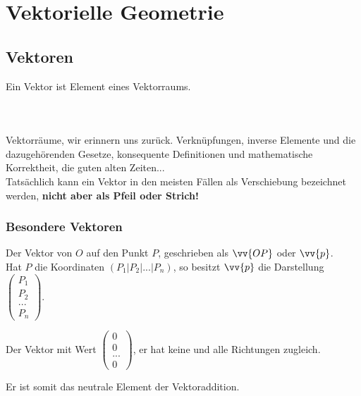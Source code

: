 \chapter{Vektorielle Geometrie}
\section{Vektoren}

    \begin{Definition}
        Ein Vektor ist Element eines Vektorraums.
    \end{Definition}\\
    \paragraph{} Vektorräume, wir erinnern uns zurück. Verknüpfungen, inverse Elemente und die dazugehörenden Gesetze, konsequente Definitionen und
    mathematische Korrektheit, die guten alten Zeiten...\\
    Tatsächlich kann ein Vektor in den meisten Fällen als Verschiebung bezeichnet werden, \textbf{nicht aber als Pfeil oder Strich!}\\


    \subsection{Besondere Vektoren}
      \begin{Definition}
        Der Vektor von $O$ auf den Punkt $P$, geschrieben als $\vv{OP}$ oder $\vv{p}$.\\
        Hat $P$ die Koordinaten $(P_1|P_2|...|P_n)$, so besitzt $\vv{p}$ die Darstellung $\left(\begin{array}{c} P_1 \\ P_2 \\ ...\\P_n\end{array}\right)$.
      \end{Definition}

      \begin{Definition}
        Der Vektor mit Wert $\left(\begin{array}{c} 0 \\ 0 \\ ...\\0\end{array}\right)$, er hat keine und alle Richtungen zugleich.
      \end{Definition}
      \begin{Bemerkung}
        Er ist somit das neutrale Element der Vektoraddition.
      \end{Bemerkung}

